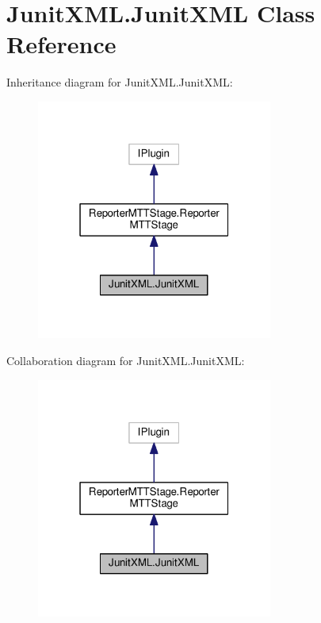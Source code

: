 \hypertarget{classJunitXML_1_1JunitXML}{\section{Junit\-X\-M\-L.\-Junit\-X\-M\-L Class Reference}
\label{classJunitXML_1_1JunitXML}
}


Inheritance diagram for Junit\-X\-M\-L.\-Junit\-X\-M\-L\-:
\nopagebreak
\begin{figure}[H]
\begin{center}
\leavevmode
\includegraphics[width=220pt]{classJunitXML_1_1JunitXML__inherit__graph}
\end{center}
\end{figure}


Collaboration diagram for Junit\-X\-M\-L.\-Junit\-X\-M\-L\-:
\nopagebreak
\begin{figure}[H]
\begin{center}
\leavevmode
\includegraphics[width=220pt]{classJunitXML_1_1JunitXML__coll__graph}
\end{center}
\end{figure}
